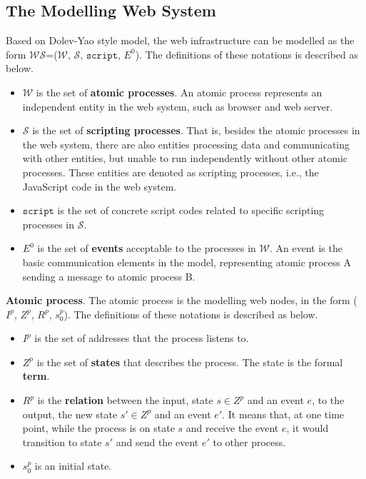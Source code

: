 \subsection{The Modelling Web System}
\label{subsec:webmodel}
Based on Dolev-Yao style model, the web  infrastructure can be modelled as the form $\mathcal{WS}$=($\mathcal{W}$, $\mathcal{S}$, $\mathtt{script}$, $E^0$). The definitions of these notations is described as below.
\begin{itemize}
\item $\mathcal{W}$ is the set of \textbf{atomic processes}. An atomic process represents an independent entity in the web system, such as browser and web server.
\item $\mathcal{S}$ is the set of \textbf{scripting processes}. That is, besides the atomic processes in the web system, there are also entities processing data and communicating with other entities, but unable to run independently without other atomic processes. These entities are denoted as scripting processes, i.e., the JavaScript code in the web system.
\item $\mathtt{script}$ is the set of concrete script codes related to specific scripting processes in $\mathcal{S}$.
\item $E^0$ is the set of \textbf{events} acceptable to the processes in $\mathcal{W}$. An event is the basic communication elements in the model, representing atomic process A sending a message to atomic process B.
\end{itemize}



\vspace{1mm}
\noindent\textbf{Atomic process}. The atomic process is the modelling web nodes, in the form ($I^p$, $Z^p$, $R^p$, $s_0^p$). The definitions of these notations is described as below.
\begin{itemize}
\item $I^p$ is the set of addresses that the process listens to.
\item  $Z^p$ is the set of \textbf{states} that describes the process. The state is the formal \textbf{term}.
\item $R^p$ is the \textbf{relation} between the input, state $s \in Z^p$ and an event $e$, to the output, the new state $s' \in Z^p$ and an event $e'$. It means that, at one time point, while the process is on state $s$ and receive the event $e$, it would transition to state $s'$ and send the event $e'$ to other process.
\item $s_0^p$ is an initial state.
\end{itemize}

